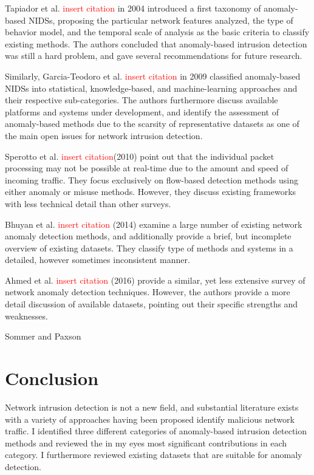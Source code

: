 \documentclass[a4paper,12pt,twoside]{report}
\begin{document}
Tapiador et al. \textcolor{red}{insert citation} in 2004 introduced a first taxonomy of anomaly-based NIDSs, proposing the particular network features analyzed, the type of behavior model, and the temporal scale of analysis as the basic criteria to classify existing methods. The authors concluded that anomaly-based intrusion detection was still a hard problem, and gave several recommendations for future research. 

Similarly, Garcia-Teodoro et al. \textcolor{red}{insert citation} in 2009 classified anomaly-based NIDSs into statistical, knowledge-based, and machine-learning approaches and their respective sub-categories. The authors furthermore discuss available platforms and systems under development, and identify the assessment of anomaly-based methods due to the scarsity of representative datasets as one of the main open issues for network intrusion detection.

Sperotto et al. \textcolor{red}{insert citation}(2010) point out that the individual packet processing may not be possible at real-time due to the amount and speed of incoming traffic. They focus exclusively on flow-based detection methods using either anomaly or misuse methods. However, they discuss existing frameworks with less technical detail than other surveys. 

Bhuyan et al. \textcolor{red}{insert citation} (2014) examine a large number of existing network anomaly detection methods, and additionally provide a brief, but incomplete overview of existing datasets. They classify type of methods and systems in a detailed, however sometimes inconsistent manner. 

Ahmed et al. \textcolor{red}{insert citation} (2016) provide a similar, yet less extensive survey of network anomaly detection techniques. However, the authors provide a more detail discussion of available datasets, pointing out their specific strengths and weaknesses.





Sommer and Paxson


\section{Conclusion}

Network intrusion detection is not a new field, and substantial literature exists with a variety of approaches having been proposed identify malicious network traffic. I identified three different categories of anomaly-based intrusion detection methods and reviewed the in my eyes most significant contributions in each category. I furthermore reviewed existing datasets that are suitable for anomaly detection. 
\end{document}
